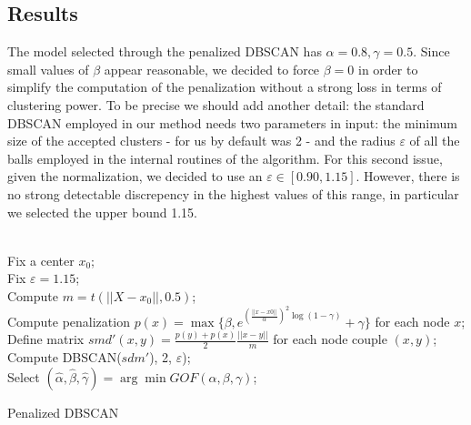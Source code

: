 \documentclass[11pt,twoside]{report}
\begin{document}
\subsection{Results}
The model selected through the penalized DBSCAN has $ \alpha=0.8, \gamma=0.5 $. Since small values of $ \beta $ appear reasonable, we decided to force $ \beta=0 $ in order to simplify the computation of the penalization without a strong loss in terms of clustering power. To be precise we should add another detail: the standard DBSCAN  employed in our method needs two parameters in input: the minimum size of the accepted clusters - for us by default was 2 - and the radius $ \varepsilon $ of all the balls employed in the internal routines of the algorithm. For this second issue, given the normalization, we decided to use an $ \varepsilon \in[0.90, 1.15] $. However, there is no strong detectable discrepency in the highest values of this range, in particular we selected the upper bound 1.15.\\
\\
\begin{algorithm}[H]
	\SetAlgoLined
	Fix a center $ x_0 $;\\
	Fix $ \varepsilon=1.15 $;\\
	Compute $ m=t(||X -x_0||,0.5) $;\\
	{
		{
			{
				 Compute penalization $ p(x) = \max\{\beta, e^{(\frac{||x-x0||}{\alpha})^2\log{(1-\gamma)}}+\gamma\} $ for each node $ x $;\\
				 Define matrix $ smd'(x,y) = \frac{p(y)+p(x)}{2}\frac{||x-y||}{m} $ for each node couple $ (x,y) $;\\
				 Compute DBSCAN($ sdm' $), 2, $\varepsilon$);\\
			}
		}
	}
	Select $ (\hat{\alpha},\hat{\beta},\hat{\gamma})=\arg\min GOF(\alpha,\beta,\gamma) $;\\
	\caption{Penalized DBSCAN}
\end{algorithm}
\end{document}

